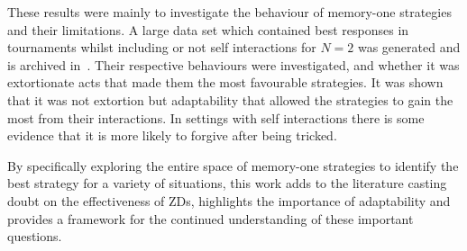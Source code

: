 These results were mainly to investigate the behaviour of memory-one strategies
and their limitations. A large data set which contained best responses in
tournaments whilst including or not self interactions for \(N=2\) was generated
and is archived in~\cite{glynatsi2019}. Their
respective behaviours were investigated, and whether it was extortionate acts that made them the
most favourable strategies. It was shown that it was not extortion but
adaptability that allowed the strategies to gain the most from their
interactions. In settings with self interactions there is some evidence that it
is more likely to forgive after being tricked.

By specifically exploring the entire space of memory-one strategies to identify
the best strategy for a variety of situations, this work adds to the literature
casting doubt on the effectiveness of ZDs, highlights the importance of
adaptability and provides a framework for the continued understanding of these
important questions.
